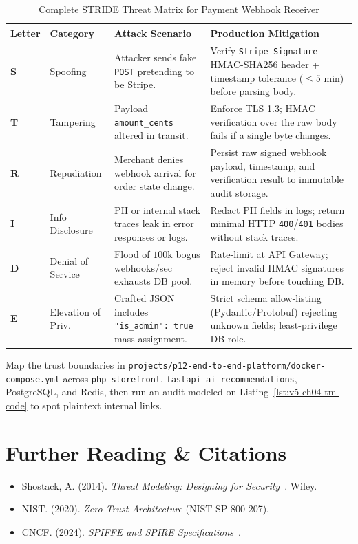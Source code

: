 \begin{table}[htbp]
\centering\scriptsize
\begin{tabular}{llp{4.0cm}p{4.6cm}}
\toprule
\textbf{Letter} & \textbf{Category} & \textbf{Attack Scenario} & \textbf{Production Mitigation} \\
\midrule
\textbf{S} & Spoofing & Attacker sends fake \texttt{POST} pretending to be Stripe. & Verify \texttt{Stripe-Signature} HMAC-SHA256 header + timestamp tolerance ($\le 5\text{ min}$) before parsing body. \\
\textbf{T} & Tampering & Payload \texttt{amount\_cents} altered in transit. & Enforce TLS 1.3; HMAC verification over the raw body fails if a single byte changes. \\
\textbf{R} & Repudiation & Merchant denies webhook arrival for order state change. & Persist raw signed webhook payload, timestamp, and verification result to immutable audit storage. \\
\textbf{I} & Info Disclosure & PII or internal stack traces leak in error responses or logs. & Redact PII fields in logs; return minimal HTTP \texttt{400}/\texttt{401} bodies without stack traces. \\
\textbf{D} & Denial of Service & Flood of $100\text{k}$ bogus webhooks/sec exhausts DB pool. & Rate-limit at API Gateway; reject invalid HMAC signatures in memory before touching DB. \\
\textbf{E} & Elevation of Priv. & Crafted JSON includes \texttt{"is\_admin": true} mass assignment. & Strict schema allow-listing (Pydantic/Protobuf) rejecting unknown fields; least-privilege DB role. \\
\bottomrule
\end{tabular}
\caption{Complete STRIDE Threat Matrix for Payment Webhook Receiver}
\label{tab:v5-ch04-webhook-stride}
\end{table}

\begin{labbridgebox}
Map the trust boundaries in \texttt{projects/p12-end-to-end-platform/docker-compose.yml} across \texttt{php-storefront}, \texttt{fastapi-ai-recommendations}, PostgreSQL, and Redis, then run an audit modeled on Listing~\ref{lst:v5-ch04-tm-code} to spot plaintext internal links.
\end{labbridgebox}

\section{Further Reading \protect\& Citations}
\begin{itemize}[leftmargin=18pt]
  \item Shostack, A. (2014). \textit{Threat Modeling: Designing for Security}~\cite{shostack2014threat}. Wiley.
  \item NIST. (2020). \textit{Zero Trust Architecture} (NIST SP 800-207).
  \item CNCF. (2024). \textit{SPIFFE and SPIRE Specifications}~\cite{spiffe}.
\end{itemize}
